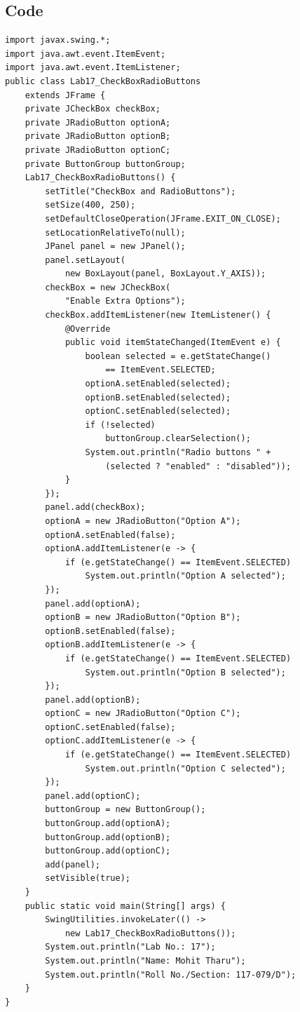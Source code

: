 \documentclass[10pt,a4paper]{article}
\begin{document}
\subsection*{Code}
\begin{multicols}{2}
\begin{lstlisting}
import javax.swing.*;
import java.awt.event.ItemEvent;
import java.awt.event.ItemListener;
public class Lab17_CheckBoxRadioButtons 
    extends JFrame {
    private JCheckBox checkBox;
    private JRadioButton optionA;
    private JRadioButton optionB;
    private JRadioButton optionC;
    private ButtonGroup buttonGroup;
    Lab17_CheckBoxRadioButtons() {
        setTitle("CheckBox and RadioButtons");
        setSize(400, 250);
        setDefaultCloseOperation(JFrame.EXIT_ON_CLOSE);
        setLocationRelativeTo(null);
        JPanel panel = new JPanel();
        panel.setLayout(
            new BoxLayout(panel, BoxLayout.Y_AXIS));
        checkBox = new JCheckBox(
            "Enable Extra Options");
        checkBox.addItemListener(new ItemListener() {
            @Override
            public void itemStateChanged(ItemEvent e) {
                boolean selected = e.getStateChange() 
                    == ItemEvent.SELECTED;
                optionA.setEnabled(selected);
                optionB.setEnabled(selected);
                optionC.setEnabled(selected);
                if (!selected) 
                    buttonGroup.clearSelection();
                System.out.println("Radio buttons " + 
                    (selected ? "enabled" : "disabled"));
            }
        });
        panel.add(checkBox);
        optionA = new JRadioButton("Option A");
        optionA.setEnabled(false);
        optionA.addItemListener(e -> {
            if (e.getStateChange() == ItemEvent.SELECTED)
                System.out.println("Option A selected");
        });
        panel.add(optionA);
        optionB = new JRadioButton("Option B");
        optionB.setEnabled(false);
        optionB.addItemListener(e -> {
            if (e.getStateChange() == ItemEvent.SELECTED)
                System.out.println("Option B selected");
        });
        panel.add(optionB);
        optionC = new JRadioButton("Option C");
        optionC.setEnabled(false);
        optionC.addItemListener(e -> {
            if (e.getStateChange() == ItemEvent.SELECTED)
                System.out.println("Option C selected");
        });
        panel.add(optionC);
        buttonGroup = new ButtonGroup();
        buttonGroup.add(optionA);
        buttonGroup.add(optionB);
        buttonGroup.add(optionC);
        add(panel);
        setVisible(true);
    }
    public static void main(String[] args) {
        SwingUtilities.invokeLater(() -> 
            new Lab17_CheckBoxRadioButtons());
        System.out.println("Lab No.: 17");
        System.out.println("Name: Mohit Tharu");
        System.out.println("Roll No./Section: 117-079/D");
    }
}
\end{lstlisting}
\end{multicols}
\end{document}

